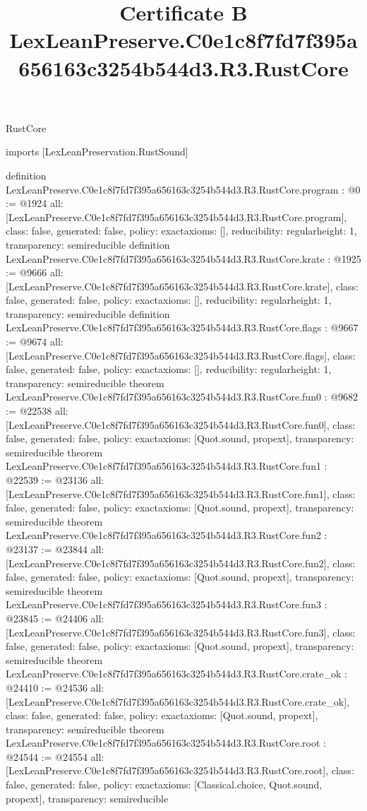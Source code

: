 \begin{lexlean}{RustCore}
\title{Certificate B LexLeanPreserve.C0e1c8f7fd7f395a656163c3254b544d3.R3.RustCore}
\begin{coremodule}
imports [LexLeanPreservation.RustSound]

definition LexLeanPreserve.C0e1c8f7fd7f395a656163c3254b544d3.R3.RustCore.program : @0 := @1924 {
  all: [LexLeanPreserve.C0e1c8f7fd7f395a656163c3254b544d3.R3.RustCore.program],
  class: false,
  generated: false,
  policy: exact{axioms: []},
  reducibility: regular{height: 1},
  transparency: semireducible
}
definition LexLeanPreserve.C0e1c8f7fd7f395a656163c3254b544d3.R3.RustCore.krate : @1925 := @9666 {
  all: [LexLeanPreserve.C0e1c8f7fd7f395a656163c3254b544d3.R3.RustCore.krate],
  class: false,
  generated: false,
  policy: exact{axioms: []},
  reducibility: regular{height: 1},
  transparency: semireducible
}
definition LexLeanPreserve.C0e1c8f7fd7f395a656163c3254b544d3.R3.RustCore.flags : @9667 := @9674 {
  all: [LexLeanPreserve.C0e1c8f7fd7f395a656163c3254b544d3.R3.RustCore.flags],
  class: false,
  generated: false,
  policy: exact{axioms: []},
  reducibility: regular{height: 1},
  transparency: semireducible
}
theorem LexLeanPreserve.C0e1c8f7fd7f395a656163c3254b544d3.R3.RustCore.fun0 : @9682 := @22538 {
  all: [LexLeanPreserve.C0e1c8f7fd7f395a656163c3254b544d3.R3.RustCore.fun0],
  class: false,
  generated: false,
  policy: exact{axioms: [Quot.sound, propext]},
  transparency: semireducible
}
theorem LexLeanPreserve.C0e1c8f7fd7f395a656163c3254b544d3.R3.RustCore.fun1 : @22539 := @23136 {
  all: [LexLeanPreserve.C0e1c8f7fd7f395a656163c3254b544d3.R3.RustCore.fun1],
  class: false,
  generated: false,
  policy: exact{axioms: [Quot.sound, propext]},
  transparency: semireducible
}
theorem LexLeanPreserve.C0e1c8f7fd7f395a656163c3254b544d3.R3.RustCore.fun2 : @23137 := @23844 {
  all: [LexLeanPreserve.C0e1c8f7fd7f395a656163c3254b544d3.R3.RustCore.fun2],
  class: false,
  generated: false,
  policy: exact{axioms: [Quot.sound, propext]},
  transparency: semireducible
}
theorem LexLeanPreserve.C0e1c8f7fd7f395a656163c3254b544d3.R3.RustCore.fun3 : @23845 := @24406 {
  all: [LexLeanPreserve.C0e1c8f7fd7f395a656163c3254b544d3.R3.RustCore.fun3],
  class: false,
  generated: false,
  policy: exact{axioms: [Quot.sound, propext]},
  transparency: semireducible
}
theorem LexLeanPreserve.C0e1c8f7fd7f395a656163c3254b544d3.R3.RustCore.crate_ok : @24410 := @24536 {
  all: [LexLeanPreserve.C0e1c8f7fd7f395a656163c3254b544d3.R3.RustCore.crate_ok],
  class: false,
  generated: false,
  policy: exact{axioms: [Quot.sound, propext]},
  transparency: semireducible
}
theorem LexLeanPreserve.C0e1c8f7fd7f395a656163c3254b544d3.R3.RustCore.root : @24544 := @24554 {
  all: [LexLeanPreserve.C0e1c8f7fd7f395a656163c3254b544d3.R3.RustCore.root],
  class: false,
  generated: false,
  policy: exact{axioms: [Classical.choice, Quot.sound, propext]},
  transparency: semireducible
}


\end{coremodule}
\end{lexlean}
